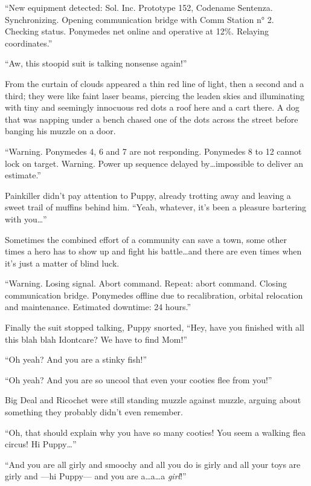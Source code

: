 ``New equipment detected: Sol. Inc. Prototype 152, Codename Sentenza. Synchronizing. Opening communication bridge with Comm Station n° 2. Checking status. Ponymedes net online and operative at 12\%. Relaying coordinates.''

``Aw, this stoopid suit is talking nonsense again!''

From the curtain of clouds appeared a thin red line of light, then a second and a third; they were like faint laser beams, piercing the leaden skies and illuminating with tiny and seemingly innocuous red dots a roof here and a cart there. A dog that was napping under a bench chased one of the dots across the street before banging his muzzle on a door.

``{\mt Warning. Ponymedes 4, 6 and 7 are not responding. Ponymedes 8 to 12 cannot lock on target. Warning. Power up sequence delayed by\dots impossible to deliver an estimate.}''

Painkiller didn't pay attention to Puppy, already trotting away and leaving a sweet trail of muffins behind him. ``Yeah, whatever, it's been a pleasure bartering with you\dots''

Sometimes the combined effort of a community can save a town, some other times a hero has to show up and fight his battle\dots and there are even times when it's just a matter of blind luck.

``{\mt Warning. Losing signal. Abort command. Repeat: abort command. Closing communication bridge. Ponymedes offline due to recalibration, orbital relocation and maintenance. Estimated downtime: 24 hours.}''

Finally the suit stopped talking, Puppy snorted, ``Hey, have you finished with all this blah blah Idontcare? We have to find Mom!''

\horizonline


``Oh yeah? And you are a stinky fish!''

``Oh yeah? And you are so uncool that even your cooties flee from you!''

Big Deal and Ricochet were still standing muzzle against muzzle, arguing about something they probably didn't even remember.

``Oh, that should explain why you have so many cooties! You seem a walking flea circus! Hi Puppy\dots''

``And you are all girly and smoochy and all you do is girly and all your toys are girly and ---hi Puppy--- and you are a\dots a\dots a \emph{girl}!''

